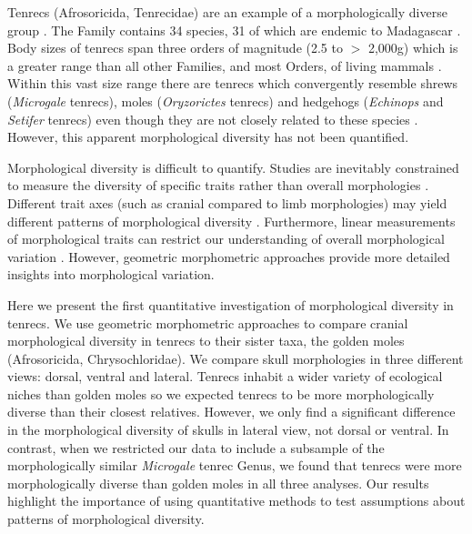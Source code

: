 \documentclass[12pt,a4paper]{article}
\begin{document}

	Tenrecs (Afrosoricida, Tenrecidae) are an example of a morphologically diverse group \citep{Soarimalala2011, Olson2003}. The Family contains 34 species, 31 of which are endemic to Madagascar \citep{Olson2013}. Body sizes of tenrecs span three orders of magnitude (2.5 to $>$ 2,000g) which is a greater range than all other Families, and most Orders, of living mammals \citep{Olson2003}. Within this vast size range there are tenrecs which convergently resemble shrews (\textit{Microgale} tenrecs), moles (\textit{Oryzorictes} tenrecs) and hedgehogs (\textit{Echinops} and \textit{Setifer} tenrecs) \citep{Eisenberg1969} even though they are not closely related to these species \citep{Stanhope1998}. However, this apparent morphological diversity has not been quantified.


	Morphological diversity is difficult to quantify. Studies are inevitably constrained to measure the diversity of specific traits rather than overall morphologies \citep{Roy1997}. Different trait axes (such as cranial compared to limb morphologies) may yield different patterns of morphological diversity \citep{Foth2012}.
	Furthermore, linear measurements of morphological traits can restrict our understanding of overall morphological variation \citep{Rohlf1993}. However, geometric morphometric approaches \citep{Rohlf1993, Adams2013} provide more detailed insights into morphological variation.
	 
	Here we present the first quantitative investigation of morphological diversity in tenrecs. We use geometric morphometric approaches to compare cranial morphological diversity in tenrecs to their sister taxa, the golden moles (Afrosoricida, Chrysochloridae). We compare skull morphologies in three different views: dorsal, ventral and lateral. 
	Tenrecs inhabit a wider variety of ecological niches \citep{Soarimalala2011} than golden moles \citep{Bronner1995} so we expected tenrecs to be more morphologically diverse than their closest relatives. However, we only find a significant difference in the morphological diversity of skulls in lateral view, not dorsal or ventral. In contrast, when we restricted our data to include a subsample of the morphologically similar \textit{Microgale} tenrec Genus, we found that tenrecs were more morphologically diverse than golden moles in all three analyses.
	Our results highlight the importance of using quantitative methods to test assumptions about patterns of morphological diversity.
\end{document}
